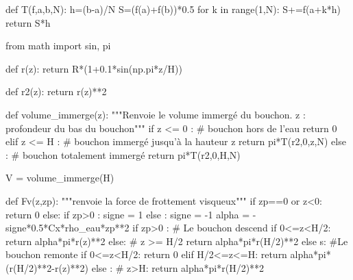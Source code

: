 \question{} 
\begin{pyverbatim}
def T(f,a,b,N):
    h=(b-a)/N
    S=(f(a)+f(b))*0.5
    for k in range(1,N):
        S+=f(a+k*h)
    return S*h
\end{pyverbatim}

\question{} 

\begin{pyverbatim}
from math import sin, pi

def r(z):
    return R*(1+0.1*sin(np.pi*z/H))
    
def r2(z):
    return r(z)**2

def volume_immerge(z):
    """Renvoie le volume immergé du bouchon.
    z : profondeur du bas du bouchon"""
    if z <= 0 :
        # bouchon hors de l'eau
        return 0
    elif z <= H :
        # bouchon immergé jusqu'à la hauteur z
        return pi*T(r2,0,z,N)
    else :
        # bouchon totalement immergé
        return pi*T(r2,0,H,N)
\end{pyverbatim}

\question{} 
\begin{pyverbatim}
V = volume_immerge(H)
\end{pyverbatim}


\question{} 
\begin{pyverbatim}
def Fv(z,zp):
    """renvoie la force de frottement visqueux"""
    if zp==0 or z<0:
        return 0
    else:
        if zp>0 : 
            signe = 1
        else :
            signe = -1
        alpha = -signe*0.5*Cx*rho_eau*zp**2
        if zp>0 : # Le bouchon descend
            if 0<=z<H/2:
                return alpha*pi*r(z)**2
            else: # z >= H/2
                return alpha*pi*r(H/2)**2
        else s: #Le bouchon remonte
            if 0<=z<H/2:
                return 0
            elif H/2<=z<=H:
                return alpha*pi*(r(H/2)**2-r(z)**2)
            else : # z>H:
                return alpha*pi*r(H/2)**2
\end{pyverbatim}


